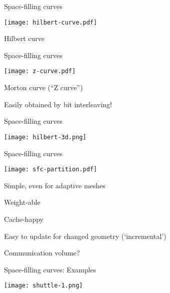 \documentclass[english,compress]{beamer}
\begin{document}
\begin{frame}{Space-filling curves}
  \begin{center}
    \texttt{[image: hilbert-curve.pdf]}

    Hilbert curve
  \end{center}
\end{frame}
\begin{frame}{Space-filling curves}
  \begin{center}
    \texttt{[image: z-curve.pdf]}

    Morton curve (``Z curve'')
  \end{center}

  Easily obtained by bit interleaving!
\end{frame}
\begin{frame}{Space-filling curves}
  \begin{center}
    \texttt{[image: hilbert-3d.png]}
  \end{center}
\end{frame}
\begin{frame}{Space-filling curves}
  \begin{center}
    \texttt{[image: sfc-partition.pdf]}
  \end{center}

  \vspace{-0.5cm}
  \plusball Simple, even for adaptive meshes

  \plusball Weight-able

  \plusball Cache-happy

  \plusball Easy to update for changed geometry (`incremental')

  \minusball Communication volume?

\end{frame}
\begin{frame}{Space-filling curves: Examples}
  \begin{center}
    \texttt{[image: shuttle-1.png]}
  \end{center}

\end{frame}
\end{document}
